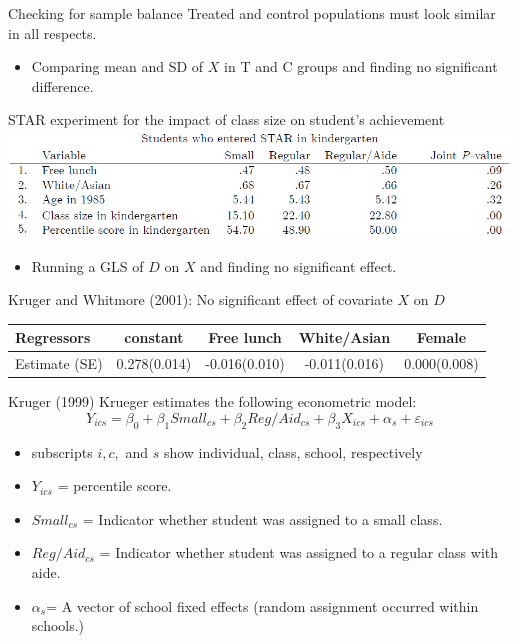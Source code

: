 \documentclass{beamer}
\begin{document}
\begin{frame}{Checking for sample balance}
Treated and control populations must look similar in all respects.\pause

\begin{itemize}
\item Comparing mean and SD of $X$ in T and C groups and finding no significant difference.
\end{itemize}
{\footnotesize STAR experiment for the impact of class size on student's achievement} \noindent\includegraphics[width=\textwidth]{./Figures/STAR.png}

\begin{itemize}
\item Running a GLS of $D$ on $X$ and finding no significant effect.
\end{itemize}\footnotesize

Kruger and Whitmore (2001): No significant effect of covariate $X$ on $D$
\begin{tabular}{lcccc}
\hline
Regressors &constant& Free lunch& White/Asian & Female\\
\hline
Estimate (SE) & 0.278(0.014) & -0.016(0.010) & -0.011(0.016) & 0.000(0.008)\\
\hline 
\end{tabular}

\end{frame}

\begin{frame}{Kruger (1999)}
Krueger estimates the following econometric model:
\[Y_{ics} = \beta_0 + \beta_1 Small_{cs} + \beta_2 Reg/Aid_{cs} + \beta_3X_{ics} + \alpha_s + \varepsilon_{ics}\]
\begin{itemize}
\item subscripts $i, c,$ and $s$ show individual, class, school, respectively
\item 	$Y_{ics}$ = percentile score.
\item 	$Small_{cs}$ = Indicator whether student was assigned to a small class.
\item 	$Reg/Aid_{cs}$ = Indicator whether student was assigned to a regular class with aide.
\item $\alpha_s$= A vector of school fixed effects (random assignment occurred within schools.)
\end{itemize}

\end{frame}
\end{document}
